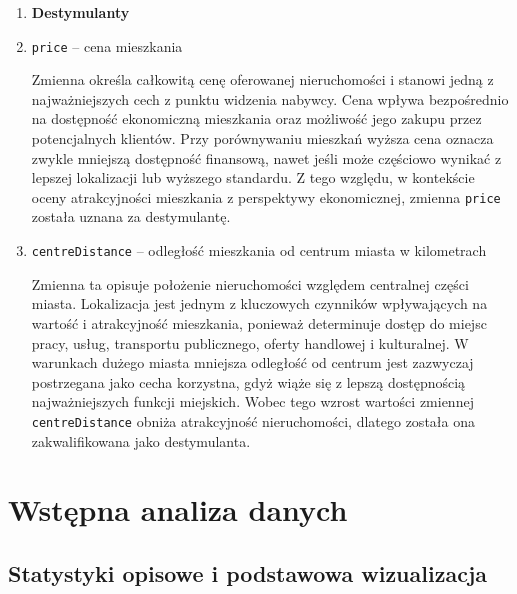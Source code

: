 \documentclass{report}
\begin{document}
\begin{enumerate}[leftmargin=*, label=\arabic*.]
    \item[] \textbf{Destymulanty}

    \item \texttt{price} -- cena mieszkania

    Zmienna określa całkowitą cenę oferowanej nieruchomości i stanowi jedną z najważniejszych cech z punktu widzenia nabywcy. Cena wpływa bezpośrednio na dostępność ekonomiczną mieszkania oraz możliwość jego zakupu przez potencjalnych klientów. Przy porównywaniu mieszkań wyższa cena oznacza zwykle mniejszą dostępność finansową, nawet jeśli może częściowo wynikać z lepszej lokalizacji lub wyższego standardu. Z tego względu, w kontekście oceny atrakcyjności mieszkania z perspektywy ekonomicznej, zmienna \texttt{price} została uznana za destymulantę.

    \item \texttt{centreDistance} -- odległość mieszkania od centrum miasta w kilometrach

    Zmienna ta opisuje położenie nieruchomości względem centralnej części miasta. Lokalizacja jest jednym z kluczowych czynników wpływających na wartość i atrakcyjność mieszkania, ponieważ determinuje dostęp do miejsc pracy, usług, transportu publicznego, oferty handlowej i kulturalnej. W warunkach dużego miasta mniejsza odległość od centrum jest zazwyczaj postrzegana jako cecha korzystna, gdyż wiąże się z lepszą dostępnością najważniejszych funkcji miejskich. Wobec tego wzrost wartości zmiennej \texttt{centreDistance} obniża atrakcyjność nieruchomości, dlatego została ona zakwalifikowana jako destymulanta.

\end{enumerate}

\section{Wstępna analiza danych}

\subsection{Statystyki opisowe i podstawowa wizualizacja}

\end{document}
